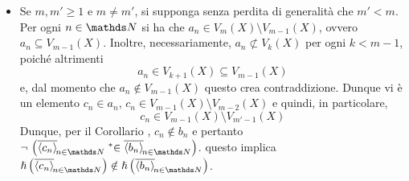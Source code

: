 {\begin{itemize}
        Se $ n \notin T $, sia allora $ c_{n} \in V_{m-1}(X)$ arbitrario. Si è costruita una successione $ \sequence{c_{n} }  $. 

        Considerando adesso i due sottoinsiemi di $ T $, $ T' $ e $ T'' $: \begin{equation*}
            T' = \set{n \in T: c_{n} \in a_{n}\setminus b_{n}   }, \quad T'' = \set{n \in T: c_{n} \in b_{n}\setminus a_{n}}
        \end{equation*}si ha che $ T'\cup T'' = T \in \mathcal{U}$ per costruzione, e quindi, per le proprietà di ultrafiltro di $ \mathcal{U} $, uno tra $ T' $ e $ T'' $ appartiene ad $ \mathcal{U} $. Senza perdita di generalità si supponga che sia $ T' $ (questo implica che $ T'' \notin \mathcal{U}$). 

        Dunque si ha che \begin{equation*}
            \filtersequence{c_{n}}\mathrel{\nonstandard{\in}}\sequence{a_{n}},\quad \lnot\,\left(\filtersequence{c_{n}}\mathrel{\nonstandard{\in}}\sequence{b_{n}}\right)
        \end{equation*}e pertanto per la definizione di $ \hslash $, \begin{equation*}
            \hslash\left(\filtersequence{c_{n}}\right) \in \hslash\left(\filtersequence{a_{n}}\right),\qquad 
            \lnot\,\left(\hslash\left(\filtersequence{c_{n}}\right) \in \hslash\left(\filtersequence{b_{n}}\right)\right),
        \end{equation*}e quindi, ovviamente, $ \hslash\left(\filtersequence{a_{n}}\right) \neq \hslash\left(\filtersequence{b_{n}}\right) $.
        \item Se $ m,m'\ge 1 $ e $ m\neq m' $, si supponga senza perdita di generalità che $ m'<m $. Per ogni $ n \in \N $ si ha che $ a_{n} \in V_{m}(X)\setminus V_{m-1}(X)$, ovvero $ a_{n} \subseteq V_{m-1}(X)$. Inoltre, necessariamente, $ a_{n} \not\subset V_{k}(X)$ per ogni $ k<m-1 $, poiché altrimenti \begin{equation*}
            a_{n} \in V_{k+1}(X)  \subseteq V_{m-1}(X) 
        \end{equation*}e, dal momento che $ a_{n} \notin V_{m-1}(X)   $ questo crea contraddizione. Dunque vi è un elemento $ c_{n} \in a_{n} $, $ c_{n} \in V_{m-1}(X)\setminus V_{m-2}(X)$ e quindi, in particolare, \begin{equation*}
            c_{n} \in V_{m-1}(X) \setminus V_{m'-1}(X)   
        \end{equation*}Dunque, per il Corollario , $ c_{n} \notin b_{n} $ e pertanto $ \lnot\,\left(\filtersequence{c_{n}}\mathrel{\nonstandard{\in}}\filtersequence{b_{n}}\right) $. questo implica $ \hslash\left(\filtersequence{c_{n}}\right)\notin \hslash\left(\filtersequence{b_{n}}\right) $. 


\end{itemize}}

